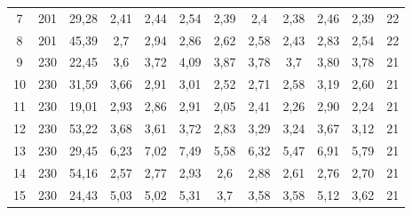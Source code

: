 \begin{landscape}
\begin{table}[!ht]
\begin{tabular}{c c c c c c c c c c c c}
            7&        201 & 29,28 &                      2,41 &                      2,44 &                      2,54 &                2,39 &                 2,4 &                2,38 &                                               2,46 &       2,39 &                 22 \\
            8&        201 & 45,39 &                       2,7 &                      2,94 &                      2,86 &                2,62 &                2,58 &                2,43 &                                               2,83 &       2,54 &                 22 \\
            9&        230 & 22,45 &                       3,6 &                      3,72 &                      4,09 &                3,87 &                3,78 &                 3,7 &                                               3,80 &       3,78 &                 21 \\
            10&        230 & 31,59 &                      3,66 &                      2,91 &                      3,01 &                2,52 &                2,71 &                2,58 &                                               3,19 &       2,60 &                 21 \\
            11&        230 & 19,01 &                      2,93 &                      2,86 &                      2,91 &                2,05 &                2,41 &                2,26 &                                               2,90 &       2,24 &                 21 \\
            12&        230 & 53,22 &                      3,68 &                      3,61 &                      3,72 &                2,83 &                3,29 &                3,24 &                                               3,67 &       3,12 &                 21 \\
            13&        230 & 29,45 &                      6,23 &                      7,02 &                      7,49 &                5,58 &                6,32 &                5,47 &                                               6,91 &       5,79 &                 21 \\
            14&        230 & 54,16 &                      2,57 &                      2,77 &                      2,93 &                 2,6 &                2,88 &                2,61 &                                               2,76 &       2,70 &                 21 \\
            15&        230 & 24,43 &                      5,03 &                      5,02 &                      5,31 &                 3,7 &                3,58 &                3,58 &                                               5,12 &       3,62 &                 21 \\

\end{tabular}
\end{table}
\end{landscape}
